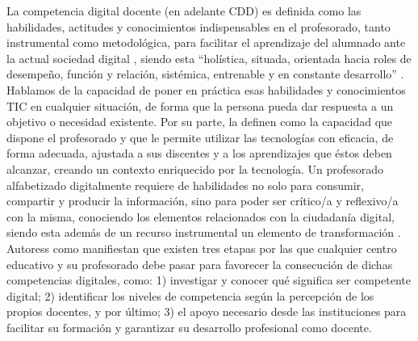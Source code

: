 \documentclass[spanish]{textolivre}
\begin{document}
La competencia digital docente (en adelante CDD) es definida como las habilidades, actitudes y conocimientos indispensables en el profesorado, tanto instrumental como metodológica, para facilitar el aprendizaje del alumnado ante la actual sociedad digital \cite{cabero-almenara2016, domingo-coscollola2019, hall2014}, siendo esta “holística, situada, orientada hacia roles de desempeño, función y relación, sistémica, entrenable y en constante desarrollo” \cite[p. 14]{castaneda2018}. Hablamos de la capacidad de poner en práctica esas habilidades y conocimientos TIC en cualquier situación, de forma que la persona pueda dar respuesta a un objetivo o necesidad existente. Por su parte, \textcite{lazaro2015} la definen como la capacidad que dispone el profesorado y que le permite utilizar las tecnologías con eficacia, de forma adecuada, ajustada a sus discentes y a los aprendizajes que éstos deben alcanzar, creando un contexto enriquecido por la tecnología. Un profesorado alfabetizado digitalmente requiere de habilidades no solo para consumir, compartir y producir la información, sino para poder ser crítico/a y reflexivo/a con la misma, conociendo los elementos relacionados con la ciudadanía digital, siendo esta además de un recurso instrumental un elemento de transformación \cite{garcia2017}. Autoress como \textcite{fraser2013} manifiestan que existen tres etapas por las que cualquier centro educativo y su profesorado debe pasar para favorecer la consecución de dichas competencias digitales, como: 1) investigar y conocer qué significa ser competente digital; 2)  identificar los  niveles  de  competencia  según  la  percepción de  los  propios  docentes, y por último; 3) el  apoyo necesario desde las instituciones para facilitar su formación y garantizar su desarrollo  profesional  como docente.
\end{document}
